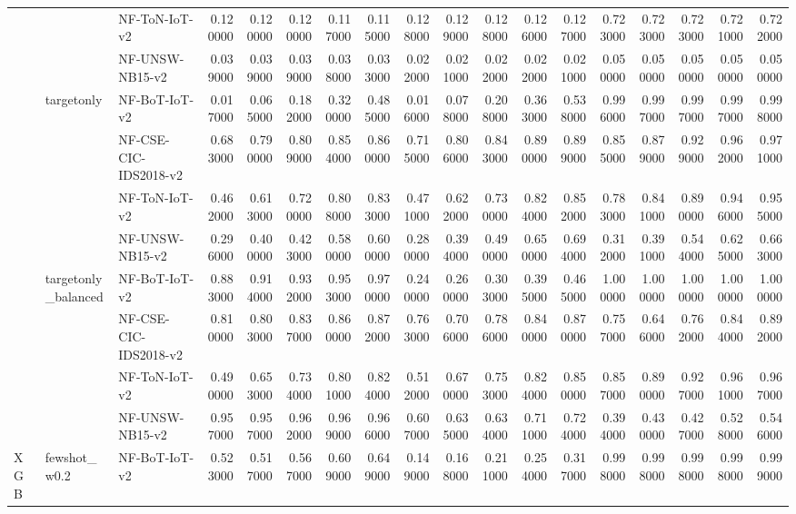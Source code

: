 \begin{tabular}{lllrrrrrrrrrrrrrrr}
 &  & NF-ToN-IoT-v2 & 0.120000 & 0.120000 & 0.120000 & 0.117000 & 0.115000 & 0.128000 & 0.129000 & 0.128000 & 0.126000 & 0.127000 & 0.723000 & 0.723000 & 0.723000 & 0.721000 & 0.722000 \\
 &  & NF-UNSW-NB15-v2 & 0.039000 & 0.039000 & 0.039000 & 0.038000 & 0.033000 & 0.022000 & 0.021000 & 0.022000 & 0.022000 & 0.021000 & 0.050000 & 0.050000 & 0.050000 & 0.050000 & 0.050000 \\
\cline{2-18}
 & \multirow[t]{4}{*}{targetonly} & NF-BoT-IoT-v2 & 0.017000 & 0.065000 & 0.182000 & 0.320000 & 0.485000 & 0.016000 & 0.078000 & 0.208000 & 0.363000 & 0.538000 & 0.996000 & 0.997000 & 0.997000 & 0.997000 & 0.998000 \\
 &  & NF-CSE-CIC-IDS2018-v2 & 0.683000 & 0.790000 & 0.809000 & 0.854000 & 0.860000 & 0.715000 & 0.806000 & 0.843000 & 0.890000 & 0.899000 & 0.855000 & 0.879000 & 0.929000 & 0.962000 & 0.971000 \\
 &  & NF-ToN-IoT-v2 & 0.462000 & 0.613000 & 0.720000 & 0.808000 & 0.833000 & 0.471000 & 0.622000 & 0.730000 & 0.824000 & 0.852000 & 0.783000 & 0.841000 & 0.890000 & 0.946000 & 0.955000 \\
 &  & NF-UNSW-NB15-v2 & 0.296000 & 0.400000 & 0.423000 & 0.580000 & 0.600000 & 0.280000 & 0.394000 & 0.490000 & 0.650000 & 0.694000 & 0.312000 & 0.391000 & 0.544000 & 0.625000 & 0.663000 \\
\cline{2-18}
 & \multirow[t]{4}{*}{targetonly_balanced} & NF-BoT-IoT-v2 & 0.883000 & 0.914000 & 0.932000 & 0.953000 & 0.970000 & 0.240000 & 0.260000 & 0.303000 & 0.395000 & 0.465000 & 1.000000 & 1.000000 & 1.000000 & 1.000000 & 1.000000 \\
 &  & NF-CSE-CIC-IDS2018-v2 & 0.810000 & 0.803000 & 0.837000 & 0.860000 & 0.872000 & 0.763000 & 0.706000 & 0.786000 & 0.840000 & 0.870000 & 0.757000 & 0.646000 & 0.762000 & 0.844000 & 0.892000 \\
 &  & NF-ToN-IoT-v2 & 0.490000 & 0.653000 & 0.734000 & 0.801000 & 0.824000 & 0.512000 & 0.670000 & 0.753000 & 0.824000 & 0.850000 & 0.857000 & 0.890000 & 0.927000 & 0.961000 & 0.967000 \\
 &  & NF-UNSW-NB15-v2 & 0.957000 & 0.957000 & 0.962000 & 0.969000 & 0.966000 & 0.607000 & 0.635000 & 0.634000 & 0.711000 & 0.724000 & 0.394000 & 0.430000 & 0.427000 & 0.528000 & 0.546000 \\
\cline{1-18} \cline{2-18}
\multirow[t]{24}{*}{XGB} & \multirow[t]{4}{*}{fewshot_w0.2} & NF-BoT-IoT-v2 & 0.523000 & 0.517000 & 0.567000 & 0.609000 & 0.649000 & 0.149000 & 0.168000 & 0.211000 & 0.254000 & 0.317000 & 0.998000 & 0.998000 & 0.998000 & 0.998000 & 0.999000 \\

\end{tabular}
